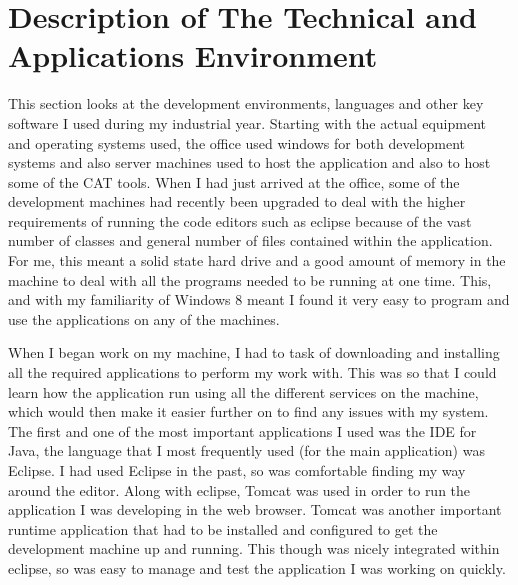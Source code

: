 \documentclass[12pt]{article}
\begin{document}


\section{Description of The Technical and Applications Environment}
This section looks at the development environments, languages and other key software I used during my industrial year.
Starting with the actual equipment and operating systems used, the office used windows for both development systems and
also server machines used to host the application and also to host some of the CAT tools. When I had just arrived at the
office, some of the development machines had recently been upgraded to deal with the higher requirements of running the
code editors such as eclipse because of the vast number of classes and general number of files contained within the
application. For me, this meant a solid state hard drive and a good amount of memory in the machine to deal with all the
programs needed to be running at one time. This, and with my familiarity of Windows 8 meant I found it very easy to
program and use the applications on any of the machines. \\ \par \noindent
When I began work on my machine, I had to task of downloading and installing all the required applications to perform my
work with. This was so that I could learn how the application run using all the different services on the machine, which
would then make it easier further on to find any issues with my system. The first and one of the most important
applications I used was the IDE for Java, the language that I most frequently used (for the main application) was
Eclipse. I had used Eclipse in the past, so was comfortable finding my way around the editor. Along with eclipse, Tomcat
was used in order to run the application I was developing in the web browser. Tomcat was another important runtime
application that had to be installed and configured to get the development machine up and running. This though was
nicely integrated within eclipse, so was easy to manage and test the application I was working on quickly. \\ \par
\noindent
\end{document}
